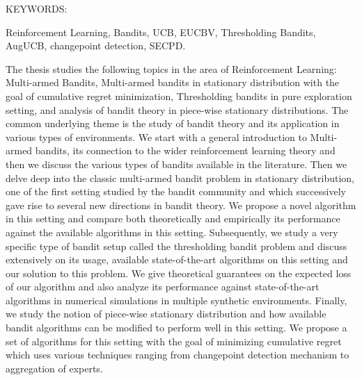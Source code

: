 \documentclass[MS]{iitmdiss}
\begin{document}
\acknowledgements
%
%


\abstract

\noindent KEYWORDS: \hspace*{0.5em} \parbox[t]{4.4in}{Reinforcement Learning, Bandits, UCB, EUCBV, Thresholding Bandits,  AugUCB, changepoint detection, SECPD.}

\vspace*{24pt}

\noindent The thesis studies the following topics in the area of Reinforcement Learning: Multi-armed Bandits, Multi-armed bandits in stationary distribution with the goal of cumulative regret minimization, Thresholding bandits in pure exploration setting, and analysis of bandit theory in piece-wise stationary distributions. The common underlying theme is the study of bandit theory and its application in various types of environments. We start with a general introduction to Multi-armed bandits, its connection to the wider reinforcement learning theory and then we discuss the various types of bandits available in the literature. Then we delve deep into the classic multi-armed bandit problem in stationary distribution, one of the first setting studied by the bandit community and which successively gave rise to several new directions in bandit theory. We propose a novel algorithm in this setting and compare both theoretically and empirically its performance against the available algorithms in this setting. Subsequently, we study a very specific type of bandit setup called the thresholding bandit problem and discuss extensively on its usage, available state-of-the-art algorithms on this setting and our solution to this problem. We give theoretical guarantees on the expected loss of our algorithm and also analyze its performance against state-of-the-art algorithms in numerical simulations in multiple synthetic environments. Finally, we study the notion of piece-wise stationary distribution and how available bandit algorithms can be modified to perform well in this setting. We propose a set of algorithms for this setting with the goal of minimizing cumulative regret which uses various techniques ranging from changepoint detection mechanism to aggregation of experts.
\end{document}
